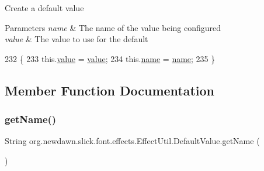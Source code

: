 Create a default value


\begin{DoxyParams}{Parameters}
{\em name} & The name of the value being configured ~\newline
\\
\hline
{\em value} & The value to use for the default \\
\hline
\end{DoxyParams}

\begin{DoxyCode}
232                                                        \{
233             this.\mbox{\hyperlink{classorg_1_1newdawn_1_1slick_1_1font_1_1effects_1_1_effect_util_1_1_default_value_a0bc4a9aca1a1dd586fe8580d9e68c8fd}{value}} = \mbox{\hyperlink{classorg_1_1newdawn_1_1slick_1_1font_1_1effects_1_1_effect_util_1_1_default_value_a0bc4a9aca1a1dd586fe8580d9e68c8fd}{value}};
234             this.\mbox{\hyperlink{classorg_1_1newdawn_1_1slick_1_1font_1_1effects_1_1_effect_util_1_1_default_value_ae33082e2b5adea01e0d97dbf24d03170}{name}} = \mbox{\hyperlink{classorg_1_1newdawn_1_1slick_1_1font_1_1effects_1_1_effect_util_1_1_default_value_ae33082e2b5adea01e0d97dbf24d03170}{name}};
235         \}
\end{DoxyCode}


\subsection{Member Function Documentation}
\mbox{\label{classorg_1_1newdawn_1_1slick_1_1font_1_1effects_1_1_effect_util_1_1_default_value_a7f3743a892a785c75a420c87575d8670}} 
\subsubsection{\texorpdfstring{get\+Name()}{getName()}}
{\footnotesize\ttfamily String org.\+newdawn.\+slick.\+font.\+effects.\+Effect\+Util.\+Default\+Value.\+get\+Name (\begin{DoxyParamCaption}{ }\end{DoxyParamCaption})\hspace{0.3cm}{\ttfamily [inline]}}

